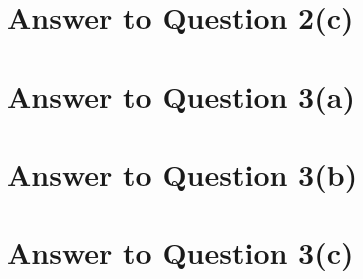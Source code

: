 \documentclass[11pt]{article}
\begin{document}
\pagebreak[4]
\section*{Answer to Question 2(c)}

\pagebreak[4]
\section*{Answer to Question 3(a)}

\pagebreak[4]
\section*{Answer to Question 3(b)}

\pagebreak[4]
\section*{Answer to Question 3(c)}
\end{document}
